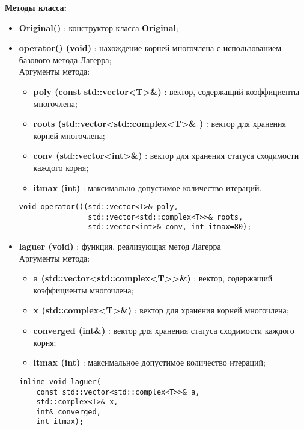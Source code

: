 \documentclass[a4paper,12pt]{article}
\begin{document}
\textbf{Методы класса:}
\begin{itemize}
    \item \textbf{Original()} : конструктор класса \textbf{Original};
    
    \item \textbf{operator() (void)} : нахождение корней многочлена с использованием базового метода Лагерра;
    \\Аргументы метода:
    \begin{itemize}
        \renewcommand{\labelitemi}{-}
        \item \textbf{poly (const std::vector<T>\&)} : вектор, содержащий коэффициенты многочлена;
        \item \textbf{roots (std::vector<std::complex<T>\& )} : вектор для хранения корней многочлена;
        \item \textbf{conv (std::vector<int>\&)} : вектор для хранения статуса сходимости каждого корня;
        \item \textbf{itmax (int)} : максимально допустимое количество итераций.
    \end{itemize}
    \begin{lstlisting}[language=С++]
void operator()(std::vector<T>& poly, 
                std::vector<std::complex<T>>& roots, 
                std::vector<int>& conv, int itmax=80); \end{lstlisting}
     \item \textbf{laguer (void)} : функция, реализующая метод Лагерра
    \\Аргументы метода:
    \begin{itemize}
        \renewcommand{\labelitemi}{-}
        \item \textbf{a (std::vector<std::complex<T>>\&)} : вектор, содержащий коэффициенты многочлена;
        \item \textbf{x (std::complex<T>\&)} : вектор для хранения корней многочлена;
        \item \textbf{converged (int\&)} : вектор для хранения статуса сходимости каждого корня;
        \item \textbf{itmax (int)} : максимальное допустимое количество итераций;
    \end{itemize}
\begin{lstlisting}[language=С++]
inline void laguer(
    const std::vector<std::complex<T>>& a,
    std::complex<T>& x,
    int& converged,
    int itmax); \end{lstlisting}
    
\end{itemize}
\newpage
\end{document}
